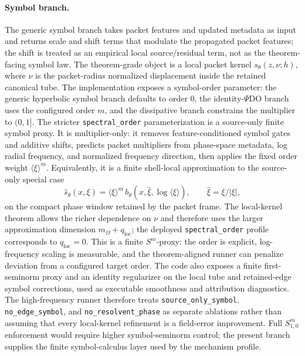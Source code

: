 \paragraph{Symbol branch.}
The generic symbol branch takes packet features and updated metadata as input and returns scale and shift terms that modulate the propagated packet features; the shift is treated as an empirical local source/residual term, not as the theorem-facing symbol law. The theorem-grade object is a local packet kernel $s_\theta(z,\nu;h)$, where $\nu$ is the packet-radius normalized displacement inside the retained canonical tube. The implementation exposes a symbol-order parameter: the generic hyperbolic symbol branch defaults to order $0$, the identity-$\Psi$DO branch uses the configured order $m$, and the dissipative branch constrains the multiplier to $(0,1]$. The stricter \texttt{spectral\_order} parameterization is a source-only finite symbol proxy. It is multiplier-only: it removes feature-conditioned symbol gates and additive shifts, predicts packet multipliers from phase-space metadata, log radial frequency, and normalized frequency direction, then applies the fixed order weight $\langle\xi\rangle^m$. Equivalently, it is a finite shell-local approximation to the source-only special case
\[
\hat s_\theta(x,\xi)
=
\langle\xi\rangle^m\,b_\theta(x,\hat\xi,\log\langle\xi\rangle),
\qquad \hat\xi=\xi/|\xi|,
\]
on the compact phase window retained by the packet frame.  The local-kernel theorem allows the richer dependence on $\nu$ and therefore uses the larger approximation dimension $m_\Omega+q_{\mathrm{loc}}$; the deployed \texttt{spectral\_order} profile corresponds to $q_{\mathrm{loc}}=0$.  This is a finite \(S^m\)-proxy: the order is explicit, log-frequency scaling is measurable, and the theorem-aligned runner can penalize deviation from a configured target order.  The code also exposes a finite first-seminorm proxy and an identity regularizer on the local tube and retained-edge symbol corrections, used as executable smoothness and attribution diagnostics.  The high-frequency runner therefore treats \texttt{source\_only\_symbol}, \texttt{no\_edge\_symbol}, and \texttt{no\_resolvent\_phase} as separate ablations rather than assuming that every local-kernel refinement is a field-error improvement.  Full $S^m_{1,0}$ enforcement would require higher symbol-seminorm control; the present branch supplies the finite symbol-calculus layer used by the mechanism profile.

